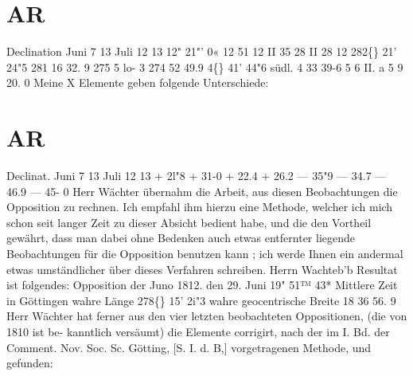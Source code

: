 \documentclass[12pt,a4paper]{article}
\newcommand{\degree}{\textdegree}
\begin{document}
\section*{AR}
Declination 
Juni    7 
13 
Juli    
12 
13 
12"  21"'    0« 
12       51       12 
II       35       28 
II       28       12 
282\degree\{\}  21'    24"5 
281     16    32. 9 
275       5     lo-  3 
274     52     49.9 
4\degree\{\}  41'   44"6  südl. 
4  33     39-6 
5  6     II. a 
5       9     20. 0 
Meine  X  Elemente  geben  folgende  Unterschiede: 

\section*{AR}
Declinat. 
Juni     7 
13 
Juli    
12 
13 
+  2l"8 
+  31-0 
+  22.4 
+  26.2 
---  35"9 
---  34.7 
---  46.9 
---  45- 0 
Herr  Wächter  übernahm  die  Arbeit,  aus  diesen  Beobachtungen  die  Opposition  zu  rechnen.  Ich 
empfahl  ihm  hierzu  eine  Methode,  welcher  ich  mich  schon  seit  langer  Zeit  zu  dieser  Absicht  bedient 
habe,  und  die  den  Vortheil  gewährt,  dass  man  dabei  ohne  Bedenken  auch  etwas  entfernter  liegende 
Beobachtungen  für  die  Opposition  benutzen  kann ;  ich  werde  Ihnen  ein  andermal  etwas  umständlicher 
über  dieses  Verfahren  schreiben.    Herrn  Wachteb'b  Resultat  ist  folgendes: 
Opposition  der  Juno  1812. 
den  29.  Juni  19"  51™  43*  Mittlere  Zeit  in  Göttingen 
wahre  Länge   
278\degree\{\}  15'    2i"3 
wahre  geocentrische  Breite   
18    36    56. 9 
Herr  Wächter  hat  ferner  aus  den  vier  letzten  beobachteten  Oppositionen,  (die  von  1810  ist  be- 
kanntlich versäumt)  die  Elemente  corrigirt,  nach  der  im  I.  Bd.  der  Comment.  Nov.  Soc.  Sc.  Götting, 
[S.  I.  d.  B,]  vorgetragenen  Methode,  und  gefunden: 
\end{document}
